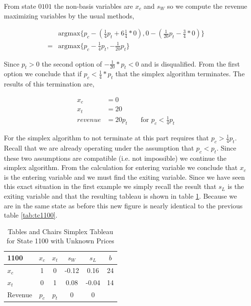 From state $0101$ the non-basis variables are $x_c$ and $s_W$ so we
compute the revenue maximizing variables by the usual methods,

\begin{align*}
&\text{argmax}\{p_c - (\frac{1}{4}p_t + 6\frac{1}{4}*0), 0 -
(\frac{1}{20}p_t - \frac{3}{4}*0)\}\\
= &\text{argmax}\{p_c - \frac{1}{4}p_t, -\frac{1}{20}p_t\}
\end{align*}

Since $p_t > 0$ the second option of $-\frac{1}{20}*p_t < 0$ and is
disqualified. From the first option we conclude that if $p_c <
\frac{1}{4}*p_t$ that the simplex algorithm terminates. The results of
this termination are,

\begin{align*}
x_c &= 0\\
x_t &= 20\\
revenue &= 20p_t && \text{ for } p_c < \frac{1}{4}p_t
\end{align*}

For the simplex algorithm to not terminate at this part requires that
$p_c > \frac{1}{4}p_t$. Recall that we are already operating under the assumption
that $p_c < p_t$. Since these two assumptions are compatible (i.e. not
impossible) we continue the simplex algorithm. From the calculation
for entering variable we conclude that $x_c$ is the entering variable
and we must find the exiting variable. Since we have seen this exact
situation in the first example we simply recall the result that $s_L$
is the exiting variable and that the resulting tableau is shown in
table \ref{tab:tcp1100}. Because we are in the same state as before this
new figure is nearly identical to the previous table \ref{tab:tc1100}.

\begin{table}
\centering
\begin{tabular}{| l | c c c c | c |}
\hline
1100    & $x_c$ & $x_t$ & $s_W$ & $s_L$ & $b$\\
\hline
$x_c$   & 1    & 0    & -0.12   & 0.16     & 24\\
$x_t$   & 0    & 1    & 0.08    & -0.04    & 14\\
\hline
Revenue & $p_c$ & $p_t$    & 0     & 0     &\\
\hline
\end{tabular}
  \caption[Tables and Chairs Simplex Tableau for State 1100 with Unknown Prices]
          {Tables and Chairs Simplex Tableau for State 1100 with Unknown Prices}
  \label{tab:tcp1100}
\end{table}

